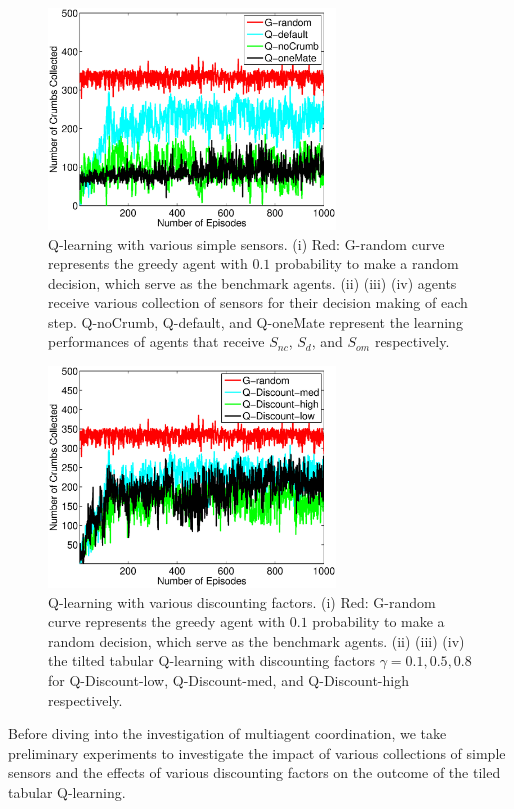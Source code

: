 \documentclass[conference]{IEEEtran}
\begin{document}
\begin{figure}[!t]
\centering
\includegraphics[width=3.0in]{./figures/RL/init_setup1.eps}
\caption{Q-learning with various simple sensors. (i) Red: G-random curve
    represents the greedy agent with $0.1$ probability to make a random
    decision, which serve as the benchmark agents. 
    (ii) (iii) (iv) agents receive various collection of sensors for their
    decision making of each step. Q-noCrumb, Q-default, and Q-oneMate
    represent the learning performances of agents that receive $S_{nc}$,
    $S_{d}$, and $S_{om}$ respectively.
} 
\label{fig:RL_init}
\end{figure}

\begin{figure}[!t]
\centering
\includegraphics[width=3.0in]{./figures/RL/init_setup2.eps}
\caption{Q-learning with various discounting factors. (i) Red: G-random curve
    represents the greedy agent with $0.1$ probability to make a random
    decision, which serve as the benchmark agents. 
    (ii) (iii) (iv) the tilted tabular Q-learning with discounting factors
    $\gamma = 0.1, 0.5, 0.8$ for Q-Discount-low, Q-Discount-med, and
    Q-Discount-high respectively.}
\label{fig:RL_init2}
\end{figure}

Before diving into the investigation of multiagent coordination, we take 
preliminary experiments to investigate the impact of various collections of
simple sensors and the effects of various discounting factors on the outcome
of the tiled tabular Q-learning.
\end{document}
